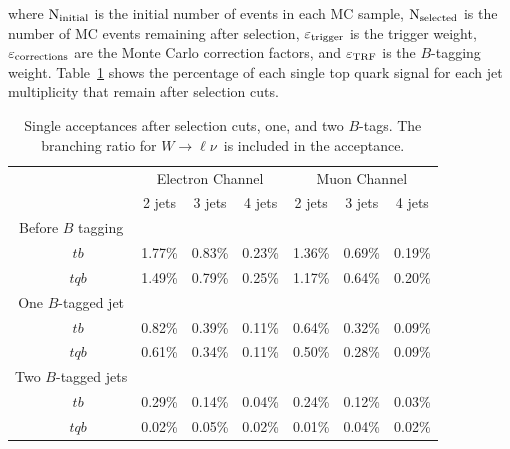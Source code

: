 \noindent where $\rm{N}_{\rm initial}$ is the initial
number of events in each MC sample, $\rm{N}_{\rm selected}$ is the number of MC events
remaining after selection, $\varepsilon_{\rm{trigger}}$ is the trigger weight, $\varepsilon_{\rm{corrections}}$ are the Monte Carlo correction factors, and $\varepsilon_{\rm{TRF}}$ is the $B$-tagging weight. Table~\ref{acceptances} shows the percentage of each single top quark
signal for each jet multiplicity that remain after selection cuts.


\vspace{0.2in}
\begin{table}[!h!tbp]
\begin{center}
\caption{Single acceptances after selection cuts, one, and two $B$-tags. The branching ratio for $W\rightarrow \ell\nu$~is included in the acceptance.}
\label{acceptances}
\begin{tabular}{c|ccc|ccc}
& \multicolumn{3}{c|}{Electron Channel} & \multicolumn{3}{c}{Muon Channel} \\
                     & 2 jets & 3 jets & 4 jets
                     & 2 jets & 3 jets & 4 jets \\
\hline
Before $B$ tagging	&        	&        	&        	&        	&        	&        	\\
~~$tb$               		& 1.77\%	& 0.83\% 	& 0.23\%	& 1.36\% 	& 0.69\% 	& 0.19\%	\\
~~$tqb$              	& 1.49\% 	& 0.79\% 	& 0.25\% 	& 1.17\% 	& 0.64\% 	& 0.20\%	\\
\hline
One $B$-tagged jet   &        	&        	&        	&        	&        	&        	\\
~~$tb$               		& 0.82\% 	& 0.39\% 	& 0.11\% 	& 0.64\% 	& 0.32\% 	& 0.09\%	\\
~~$tqb$              	& 0.61\% 	& 0.34\% 	& 0.11\% 	& 0.50\% 	& 0.28\% 	& 0.09\%	\\
\hline
Two $B$-tagged jets	&        	&        	&        	&        	&        	&        	\\
~~$tb$               		& 0.29\% 	& 0.14\% 	& 0.04\% 	& 0.24\% 	& 0.12\% 	& 0.03\%	\\
~~$tqb$              	& 0.02\% 	& 0.05\% 	& 0.02\% 	& 0.01\% 	& 0.04\% 	& 0.02\%
\end{tabular}
\vspace{-0.1in}
\end{center}
\end{table}
